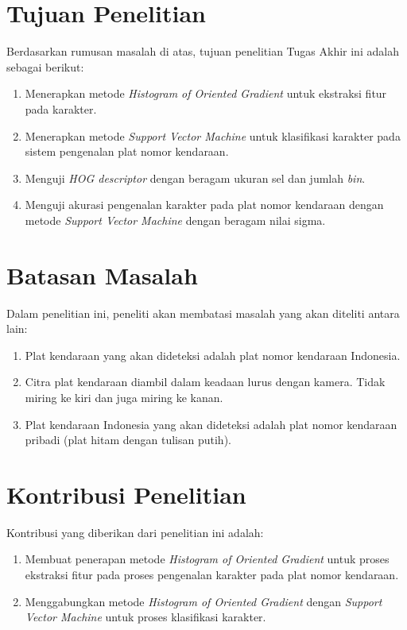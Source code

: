 \section{Tujuan Penelitian}
\noindent Berdasarkan rumusan masalah di atas, tujuan penelitian Tugas Akhir ini adalah sebagai berikut:
\begin{enumerate}[nolistsep,leftmargin=0.5cm]
\item Menerapkan metode \textit{Histogram of Oriented Gradient} untuk ekstraksi fitur pada karakter.
\item Menerapkan metode \textit{Support Vector Machine} untuk klasifikasi karakter pada sistem pengenalan plat nomor kendaraan.
\item Menguji \textit{HOG descriptor} dengan beragam ukuran sel dan jumlah \textit{bin}. 
\item Menguji akurasi pengenalan karakter pada plat nomor kendaraan dengan metode \textit{Support Vector Machine} dengan beragam nilai sigma.\\
\end{enumerate}

\section{Batasan Masalah}
\noindent Dalam penelitian ini, peneliti akan membatasi masalah yang akan diteliti antara lain:
\begin{enumerate}[nolistsep,leftmargin=0.5cm]
\item Plat kendaraan yang akan dideteksi adalah plat nomor kendaraan Indonesia.
\item Citra plat kendaraan diambil dalam keadaan lurus dengan kamera. Tidak miring ke kiri dan juga miring ke kanan.
\item Plat kendaraan Indonesia yang akan dideteksi adalah plat nomor kendaraan pribadi (plat hitam dengan tulisan putih).\\
\end{enumerate}

\section{Kontribusi Penelitian}
\noindent Kontribusi yang diberikan dari penelitian ini adalah:
\begin{enumerate}[nolistsep,leftmargin=0.5cm]
\item Membuat penerapan metode \textit{Histogram of Oriented Gradient} untuk proses ekstraksi fitur pada proses pengenalan karakter pada plat nomor kendaraan.
\item Menggabungkan metode \textit{Histogram of Oriented Gradient} dengan \textit{Support Vector Machine} untuk proses klasifikasi karakter.\\
\end{enumerate}

